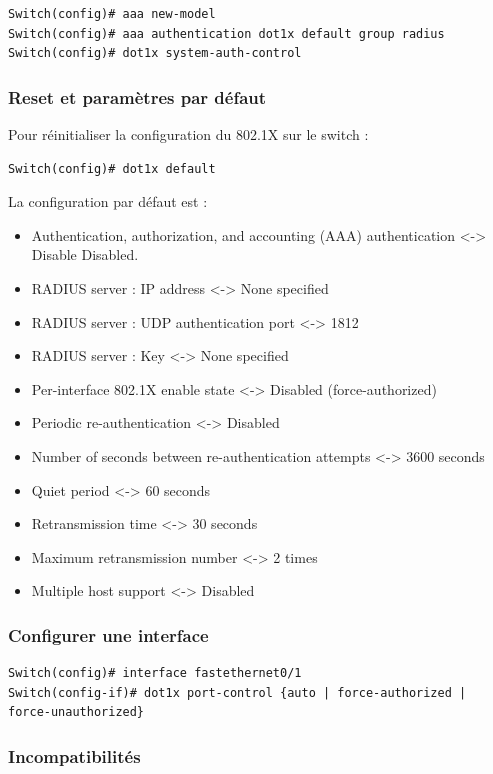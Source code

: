 \begin{verbatim}
Switch(config)# aaa new-model
Switch(config)# aaa authentication dot1x default group radius
Switch(config)# dot1x system-auth-control
\end{verbatim}

\subsubsection{Reset et paramètres par défaut}

Pour réinitialiser la configuration du 802.1X sur le switch :

\begin{verbatim}
Switch(config)# dot1x default
\end{verbatim}

La configuration par défaut est :
\begin{itemize}
\item Authentication, authorization, and accounting (AAA) authentication <-> Disable
Disabled. 
\item RADIUS server : IP address <-> None specified
\item RADIUS server : UDP authentication port <-> 1812
\item RADIUS server : Key <-> None specified
\item Per-interface 802.1X enable state <-> Disabled (force-authorized)
\item Periodic re-authentication <-> Disabled
\item Number of seconds between re-authentication attempts <-> 3600 seconds
\item Quiet period <-> 60 seconds
\item Retransmission time <-> 30 seconds
\item Maximum retransmission number <-> 2 times
\item Multiple host support <-> Disabled
\end{itemize}

\subsubsection{Configurer une interface}

\begin{verbatim}
Switch(config)# interface fastethernet0/1
Switch(config-if)# dot1x port-control {auto | force-authorized | force-unauthorized}
\end{verbatim}

\subsubsection{Incompatibilités}

